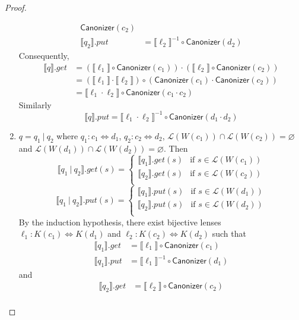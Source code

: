 \documentclass{svproc}
\newcommand{\kw}[1]{\ensuremath{\mathsf{#1}}}
\newcommand{\sep}{\ensuremath{\ | \ }}
\newcommand{\canonizer}{\ensuremath{\kw{Canonizer}}}
\begin{document}
\begin{proof}
\begin{enumerate}
\begin{align*}
\canonizer(c_2)\\
\llbracket q_2 \rrbracket.put &= {\llbracket \ell_2 \rrbracket}^{-1} \circ
\canonizer(d_2)
\end{align*}
Consequently,
\begin{align*}
  \llbracket q \rrbracket.get &= (\llbracket \ell_1 \rrbracket \circ
\canonizer(c_1)) \cdot  (\llbracket \ell_2 \rrbracket \circ
\canonizer(c_2))\\
&= (\llbracket \ell_1 \rrbracket \cdot \llbracket \ell_2
\rrbracket) \circ (\canonizer(c_1) \cdot \canonizer(c_2))\\
&= \llbracket \ell_1 \cdot  \ell_2 \rrbracket \circ \canonizer(c_1 \cdot c_2)
\end{align*}
Similarly
$$
  \llbracket q \rrbracket.put = \llbracket \ell_1 \cdot  \ell_2 \rrbracket^{-1}
  \circ \canonizer(d_1 \cdot d_2) $$
  \item
  $q = q_1 \sep q_2$ where $q_1 : c_1 \Leftrightarrow d_1 $, $q_2 : c_2
  \Leftrightarrow d_2$, $\mathcal{L}(W(c_1)) \cap \mathcal{L}(W(c_2)) =
  \varnothing$ and $\mathcal{L}(W(d_1)) \cap \mathcal{L}(W(d_2)) = \varnothing$.
  Then
  $$
  \llbracket q_1 \sep q_2 \rrbracket.get(s) = 
  \begin{cases}
  \llbracket q_1 \rrbracket.get (s) & \text{if } s \in \mathcal{L}(W(c_1))\\
  \llbracket q_2 \rrbracket.get (s) & \text{if } s \in \mathcal{L}(W(c_2))\\
  \end{cases}$$
  $$\llbracket q_1 \sep q_2 \rrbracket.put(s) = 
  \begin{cases}
  \llbracket q_1 \rrbracket.put (s) & \text{if } s \in \mathcal{L}(W(d_1))\\
  \llbracket q_2 \rrbracket.put (s) & \text{if } s \in \mathcal{L}(W(d_2))\\
  \end{cases}
  $$
By the induction hypothesis, there exist bijective lenses $\ell_1 : K(c_1)
\Leftrightarrow K(d_1)$ and $\ell_2 : K(c_2) \Leftrightarrow K(d_2)$ such that
\begin{align*}
\llbracket q_1 \rrbracket.get &= \llbracket \ell_1 \rrbracket \circ
\canonizer(c_1)\\
\llbracket q_1 \rrbracket.put &= {\llbracket \ell_1 \rrbracket}^{-1} \circ
\canonizer(d_1)
\end{align*}
and
\begin{align*}
\llbracket q_2 \rrbracket.get &= \llbracket \ell_2 \rrbracket \circ
\canonizer(c_2)\\

\end{align*}
\end{enumerate}
\end{proof}
\end{document}
